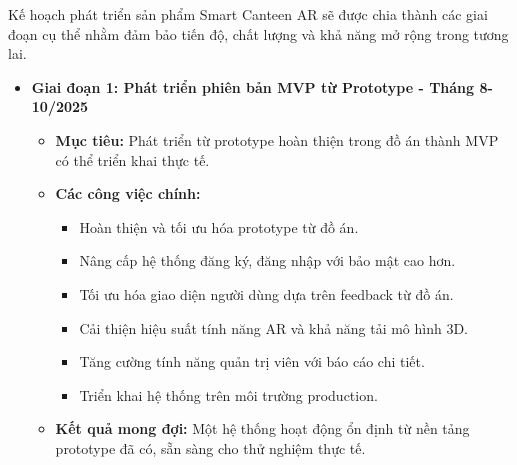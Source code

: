 \documentclass[12pt,a4paper]{article}
\begin{document}
Kế hoạch phát triển sản phẩm Smart Canteen AR sẽ được chia thành các giai đoạn cụ thể nhằm đảm bảo tiến độ, chất lượng và khả năng mở rộng trong tương lai.
\begin{itemize}[label=\textbullet]
    \item \textbf{Giai đoạn 1: Phát triển phiên bản MVP từ Prototype - Tháng 8-10/2025}
    \begin{itemize}[label=\textendash]
        \item \textbf{Mục tiêu:} Phát triển từ prototype hoàn thiện trong đồ án thành MVP có thể triển khai thực tế.
        \item \textbf{Các công việc chính:}
        \begin{itemize}[label=\textrightarrow]
            \item Hoàn thiện và tối ưu hóa prototype từ đồ án.
            \item Nâng cấp hệ thống đăng ký, đăng nhập với bảo mật cao hơn.
            \item Tối ưu hóa giao diện người dùng dựa trên feedback từ đồ án.
            \item Cải thiện hiệu suất tính năng AR và khả năng tải mô hình 3D.
            \item Tăng cường tính năng quản trị viên với báo cáo chi tiết.
            \item Triển khai hệ thống trên môi trường production.
        \end{itemize}
        \item \textbf{Kết quả mong đợi:} Một hệ thống hoạt động ổn định từ nền tảng prototype đã có, sẵn sàng cho thử nghiệm thực tế.
    \end{itemize}


\end{itemize}
\end{document}
